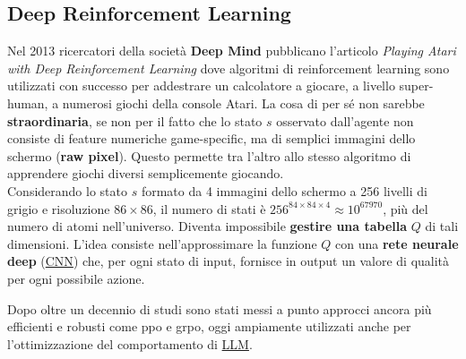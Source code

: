 \subsection{Deep Reinforcement Learning}\label{sub:rl_deep_reinforcement_learning} %
Nel 2013 ricercatori della società \textbf{Deep Mind} pubblicano l'articolo \textit{Playing Atari with Deep Reinforcement Learning} dove algoritmi di reinforcement learning sono utilizzati con successo per addestrare un calcolatore a giocare, a livello super-human, a numerosi giochi della console Atari.
\emptyln{}
La cosa di per sé non sarebbe \textbf{straordinaria}, se non per il fatto che lo stato $s$ osservato dall'agente non consiste di feature numeriche game-specific, ma di semplici immagini dello schermo (\textbf{raw pixel}).
Questo permette tra l'altro allo stesso algoritmo di apprendere giochi diversi semplicemente giocando.
\\
Considerando lo stato $s$ formato da 4 immagini dello schermo a 256 livelli di grigio e risoluzione $86\times86$, il numero di stati è $256^{84\times84\times4} \approx 10^{67970}$, più del numero di atomi nell'universo.
Diventa impossibile \textbf{gestire una tabella} $Q$ di tali dimensioni.
\emptyln{}
L'idea consiste nell'approssimare la funzione $Q$ con una \textbf{rete neurale deep} (\hyperref[sec:cnn]{CNN}) che, per ogni stato di input, fornisce in output un valore di qualità per ogni possibile azione.
\begin{note}
    Dopo oltre un decennio di studi sono stati messi a punto approcci ancora più efficienti e robusti come \ac{ppo} e \ac{grpo}, oggi ampiamente utilizzati anche per l'ottimizzazione del comportamento di \hyperref[sub:large_language_models]{LLM}.
\end{note}
